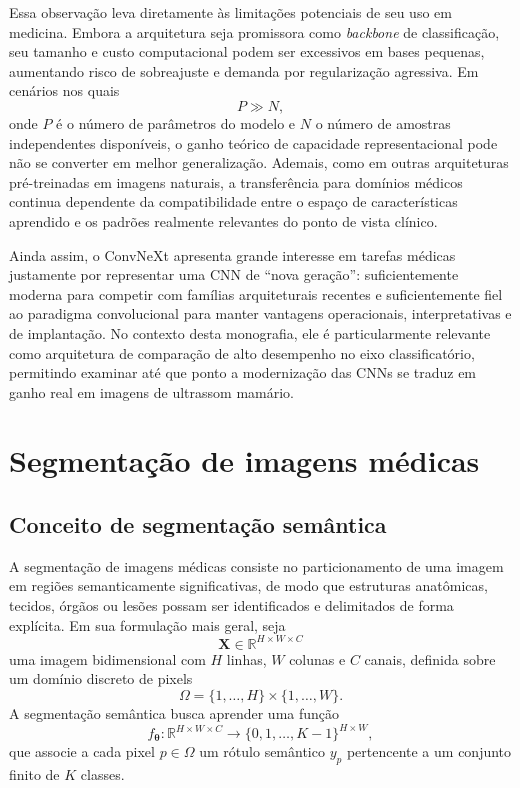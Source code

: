 \documentclass[tcc,capa]{texufpel}
\begin{document}
Essa observação leva diretamente às limitações potenciais de seu uso em medicina. Embora a arquitetura seja promissora como \textit{backbone} de classificação, seu tamanho e custo computacional podem ser excessivos em bases pequenas, aumentando risco de sobreajuste e demanda por regularização agressiva. Em cenários nos quais
\begin{equation}
	P \gg N,
\end{equation}
onde \(P\) é o número de parâmetros do modelo e \(N\) o número de amostras independentes disponíveis, o ganho teórico de capacidade representacional pode não se converter em melhor generalização. Ademais, como em outras arquiteturas pré-treinadas em imagens naturais, a transferência para domínios médicos continua dependente da compatibilidade entre o espaço de características aprendido e os padrões realmente relevantes do ponto de vista clínico.

Ainda assim, o ConvNeXt apresenta grande interesse em tarefas médicas justamente por representar uma CNN de “nova geração”: suficientemente moderna para competir com famílias arquiteturais recentes e suficientemente fiel ao paradigma convolucional para manter vantagens operacionais, interpretativas e de implantação. No contexto desta monografia, ele é particularmente relevante como arquitetura de comparação de alto desempenho no eixo classificatório, permitindo examinar até que ponto a modernização das CNNs se traduz em ganho real em imagens de ultrassom mamário.

\section{Segmentação de imagens médicas}

\subsection{Conceito de segmentação semântica}

A segmentação de imagens médicas consiste no particionamento de uma imagem em regiões semanticamente significativas, de modo que estruturas anatômicas, tecidos, órgãos ou lesões possam ser identificados e delimitados de forma explícita. Em sua formulação mais geral, seja
\begin{equation}
	\mathbf{X} \in \mathbb{R}^{H \times W \times C}
\end{equation}
uma imagem bidimensional com \(H\) linhas, \(W\) colunas e \(C\) canais, definida sobre um domínio discreto de pixels
\begin{equation}
	\Omega = \{1,\dots,H\} \times \{1,\dots,W\}.
\end{equation}
A segmentação semântica busca aprender uma função
\begin{equation}
	f_{\boldsymbol{\theta}} : \mathbb{R}^{H \times W \times C} \rightarrow \{0,1,\dots,K-1\}^{H \times W},
\end{equation}
que associe a cada pixel \(p \in \Omega\) um rótulo semântico \(y_p\) pertencente a um conjunto finito de \(K\) classes.
\end{document}
